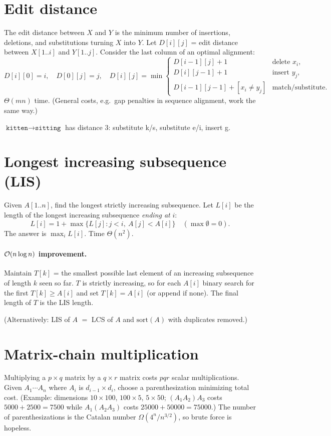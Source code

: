 \section{Edit distance}
The edit distance between $X$ and $Y$ is the minimum number of insertions, deletions, and substitutions turning $X$ into $Y$.
Let $D[i][j]$ = edit distance between $X[1..i]$ and $Y[1..j]$. Consider the last column of an optimal alignment:
\[
D[i][0]=i,\quad D[0][j]=j,\quad
D[i][j]=\min\begin{cases}
D[i-1][j]+1 & \text{delete }x_i,\\
D[i][j-1]+1 & \text{insert }y_j,\\
D[i-1][j-1]+[x_i\ne y_j] & \text{match/substitute.}
\end{cases}
\]
$\Theta(mn)$ time. (General costs, e.g.\ gap penalties in sequence alignment, work the same way.)
\begin{example}
$\texttt{kitten}\to\texttt{sitting}$ has distance 3: substitute k/s, substitute e/i, insert g.
\end{example}

\section{Longest increasing subsequence (LIS)}
Given $A[1..n]$, find the longest strictly increasing subsequence.
Let $L[i]$ be the length of the longest increasing subsequence \emph{ending at} $i$:
\[
L[i]=1+\max\{L[j]: j<i,\ A[j]<A[i]\}\quad(\max\emptyset=0).
\]
The answer is $\max_iL[i]$. Time $\Theta(n^2)$.

\paragraph{$\mathcal{O}(n\log n)$ improvement.} Maintain $T[k]$ = the smallest possible last element of an increasing subsequence
of length $k$ seen so far. $T$ is strictly increasing, so for each $A[i]$ binary search for the first $T[k]\ge A[i]$ and set
$T[k]=A[i]$ (or append if none). The final length of $T$ is the LIS length.

(Alternatively: LIS of $A$ $=$ LCS of $A$ and $\mathrm{sort}(A)$ with duplicates removed.)

\section{Matrix-chain multiplication}
Multiplying a $p\times q$ matrix by a $q\times r$ matrix costs $pqr$ scalar multiplications. Given $A_1\cdots A_n$ where $A_i$ is
$d_{i-1}\times d_i$, choose a parenthesization minimizing total cost. (Example: dimensions $10\times100$, $100\times5$, $5\times50$;
$(A_1A_2)A_3$ costs $5000+2500=7500$ while $A_1(A_2A_3)$ costs $25000+50000=75000$.)
The number of parenthesizations is the Catalan number $\Omega(4^n/n^{3/2})$, so brute force is hopeless.

